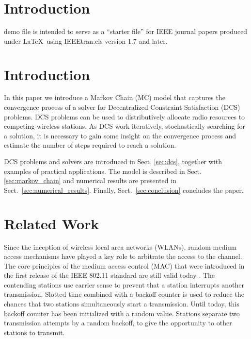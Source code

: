 \documentclass[journal]{IEEEtran}
\begin{document}
\section{Introduction}
% 
% 
% 
% 
 demo file is intended to serve as a ``starter file''
for IEEE journal papers produced under \LaTeX\ using
IEEEtran.cls version 1.7 and later.


\section{Introduction}

In this paper we introduce a Markov Chain (MC) model that captures the convergence process of a solver for Decentralized Constraint Satisfaction (DCS) problems.
DCS problems can be used to distributively allocate radio resources to competing wireless stations.
As DCS work iteratively, stochastically searching for a solution, it is necessary to gain some insight on the convergence process and estimate the number of steps required to reach a solution.

DCS problems and solvers are introduced in Sect. \ref{sec:dcs}, together with examples of practical applications.
The model is described in Sect. \ref{sec:markov_chain} and numerical results are presented in Sect.~\ref{sec:numerical_results}.
Finally, Sect.~\ref{sec:conclusion} concludes the paper.

\section{Related Work}
Since the inception of wireless local area networks (WLANs), random medium access mechanisms have played a key role to arbitrate the access to the channel.
The core principles of the medium access control (MAC) that were introduced in the first release of the IEEE 802.11 standard are still valid today \cite{IEEE80211-IEEESTD2007}.
The contending stations use carrier sense to prevent that a station interrupts another transmission.
Slotted time combined with a backoff counter is used to reduce the chances that two stations simultaneously start a transmission.
Until today, this backoff counter has been initialized with a random value.
Stations separate two transmission attempts by a random backoff, to give the opportunity to other stations to transmit.
\end{document}
